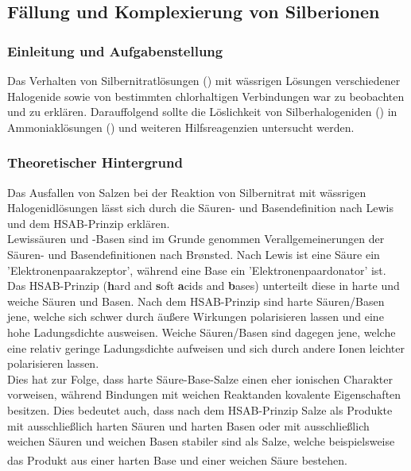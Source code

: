 \documentclass[
	a4paper,										%
	12pt,											%
	twoside,										%
	headsepline,								%
	footsepline,									%
	captions=tableheading,					%
]{scrartcl}
\newcommand{\zitat}[1]{\textsuperscript{\cite{#1}}}
\begin{document}
\newpage

\setcounter{subsection}{1}							%
\setcounter{secnumdepth}{4}
	
\subsection{Fällung und Komplexierung von Silberionen}

\subsubsection{Einleitung und Aufgabenstellung}

	Das Verhalten von Silbernitratlösungen () mit wässrigen Lösungen verschiedener Halogenide sowie von bestimmten chlorhaltigen Verbindungen war zu beobachten und zu erklären.
	Darauffolgend sollte die Löslichkeit von Silberhalogeniden () in Ammoniaklösungen () und weiteren Hilfsreagenzien untersucht werden.

\subsubsection{Theoretischer Hintergrund}

	Das Ausfallen von Salzen bei der Reaktion von Silbernitrat mit wässrigen Halogenidlösungen lässt sich durch die Säuren- und Basendefinition nach Lewis und dem HSAB-Prinzip erklären.\\
	Lewissäuren und -Basen sind im Grunde genommen Verallgemeinerungen der Säuren- und Basendefinitionen nach Br\o nsted. Nach Lewis ist eine Säure ein 'Elektronenpaarakzeptor',
	während eine Base ein 'Elektronenpaardonator' ist.\\
	Das HSAB-Prinzip (\textbf{h}ard and \textbf{s}oft \textbf{a}cids and \textbf{b}ases) unterteilt diese in harte und weiche Säuren und Basen. Nach dem HSAB-Prinzip sind harte Säuren/Basen jene,
	welche sich schwer durch äußere Wirkungen polarisieren lassen und eine hohe Ladungsdichte ausweisen. Weiche Säuren/Basen sind dagegen jene, welche eine relativ geringe Ladungsdichte aufweisen
	und sich durch andere Ionen leichter polarisieren lassen.\\
	Dies hat zur Folge, dass harte Säure-Base-Salze einen eher ionischen Charakter vorweisen, während Bindungen mit weichen Reaktanden kovalente Eigenschaften besitzen.
	Dies bedeutet auch, dass nach dem HSAB-Prinzip Salze als Produkte mit ausschließlich harten Säuren und harten Basen oder mit ausschließlich weichen Säuren und weichen Basen stabiler sind
	als Salze, welche beispielsweise das Produkt aus einer harten Base und einer weichen Säure bestehen.\zitat{riedel3}\\
\end{document}
